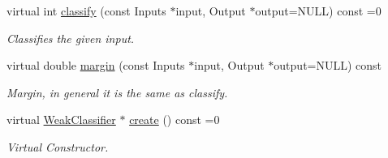 \begin{DoxyCompactItemize}
virtual int \hyperlink{classiCub_1_1boostMIL_1_1WeakClassifier_a8a3fe3145859ef045f4b7e3f1a61d984}{classify} (const Inputs $\ast$input, Output $\ast$output=N\+U\+L\+L) const =0
\begin{DoxyCompactList}\small\item\em Classifies the given input. \end{DoxyCompactList}\item 
virtual double \hyperlink{classiCub_1_1boostMIL_1_1WeakClassifier_a01b3c3834f0b0b81513ed49907bb2c16}{margin} (const Inputs $\ast$input, Output $\ast$output=N\+U\+L\+L) const 
\begin{DoxyCompactList}\small\item\em Margin, in general it is the same as classify. \end{DoxyCompactList}\item 
virtual \hyperlink{classiCub_1_1boostMIL_1_1WeakClassifier}{Weak\+Classifier} $\ast$ \hyperlink{classiCub_1_1boostMIL_1_1WeakClassifier_a4857091405bd2d93966e4a47391b6e55}{create} () const =0\label{classiCub_1_1boostMIL_1_1WeakClassifier_a4857091405bd2d93966e4a47391b6e55}

\begin{DoxyCompactList}\small\item\em Virtual Constructor. \end{DoxyCompactList}\end{DoxyCompactItemize}
